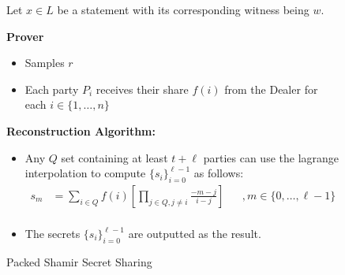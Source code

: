 \begin{figure}[ht]
    \centering
    \begin{tcolorbox}[title=\textbf{Sigma ($\sum$) Protocol}, width=0.9\textwidth, colframe=blue!75!black, colback=blue!10, sharp corners]
        Let $x\in L$ be a statement with its corresponding witness being $w$.
        
        \vspace{0.5em}
        \textbf{Prover}
        \begin{itemize}
            \item Samples $r$
            \item Each party $P_i$ receives their share $f(i)$ from the Dealer
                  for each $i\in\{1,\dots,n\}$
        \end{itemize}
        
        \vspace{0.5em}
        \textbf{Reconstruction Algorithm:}
        \begin{itemize}
            \item Any $Q$ set containing at least $t+\ell$ parties can use the 
            lagrange interpolation to compute $\{s_i\}_{i=0}^{\ell-1}$ as follows:
            \begin{align*}
                s_m &= \sum_{i\in Q} f(i) \left[\prod_{j\in Q, j\neq i}\frac{-m-j}{i-j}\right] &&, m\in\{0,\dots,\ell-1\} \\
            \end{align*}
            \item The secrets $\{s_i\}_{i=0}^{\ell-1}$ are outputted as the result.
        \end{itemize}
    \end{tcolorbox}
    \caption{Packed Shamir Secret Sharing}
    \label{fig:packed-shamir}
\end{figure}